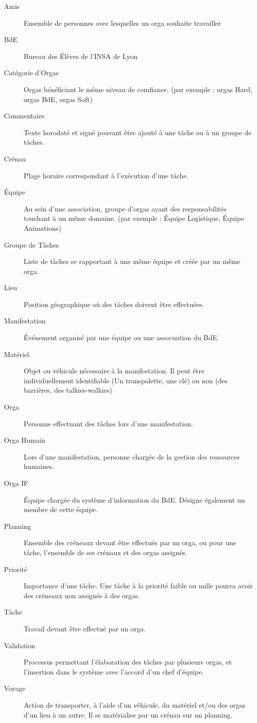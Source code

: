 \begin{description}
\item[Amis] Ensemble de personnes avec lesquelles un orga souhaite travailler 
\item[BdE] Bureau des Élèves de l'INSA de Lyon
\item[Catégorie d'Orgas] Orgas bénéficiant le même niveau de comfiance. (par exemple : orgas Hard, orgas BdE, orgas Soft)
\item[Commentaire] Texte horodaté et signé pouvant être ajouté à une tâche ou à un groupe de tâches.
\item[Crénau] Plage horaire correspondant à l'exécution d'une tâche.
\item[Équipe] Au sein d'une association, groupe d'orgas ayant des responsabilités touchant à un même domaine. (par exemple : Équipe Logistique, Équipe Animations)
\item[Groupe de Tâches] Liste de tâches se rapportant à une même équipe et créée par un même orga.
\item[Lieu] Position géographique où des tâches doivent être effectuées.
\item[Manifestation] Événement organisé par une équipe ou une assocuation du BdE.
\item[Matériel] Objet ou véhicule nécessaire à la manifestation. Il peut être individuellement identifiable (Un transpalette, une clé) ou non (des barrières, des talkies-walkies)
\item[Orga] Personne effectuant des tâches lors d'une manifestation.
\item[Orga Humain] Lors d'une manifestation, personne chargée de la gestion des ressources humaines.
\item[Orga IF] Équipe chargée du système d'information du BdE. Désigne également un membre de cette équipe.
\item[Planning] Ensemble des créneaux devant être effectués par un orga, ou pour une tâche, l'ensemble de ses crénaux et des orgas assignés. 
\item[Priorité] Importance d'une tâche. Une tâche à la priorité faible ou nulle pourra avoir des créneaux non assignés à des orgas.
\item[Tâche] Travail devant être effectué par un orga.
\item[Validation] Processus permettant l'élaboration des tâches par plusieurs orgas, et l'insertion dans le système avec l'accord d'un chef d'équipe.
\item[Voyage] Action de transporter, à l'aide d'un véhicule, du matériel et/ou des orgas d'un lieu à un autre. Il se matérialise par un crénau sur un planning.


 \end{description}